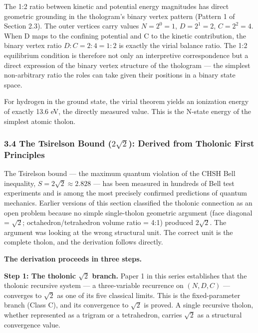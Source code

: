 \documentclass[
  11pt,
  letterpaper,
]{article}
\begin{document}
The 1:2 ratio between kinetic and potential energy magnitudes has direct
geometric grounding in the thologram's binary vertex pattern (Pattern 1
of Section 2.3). The outer vertices carry values \(N = 2^0 = 1\),
\(D = 2^1 = 2\), \(C = 2^2 = 4\). When D maps to the confining potential
and C to the kinetic contribution, the binary vertex ratio
\(D:C = 2:4 = 1:2\) is exactly the virial balance ratio. The 1:2
equilibrium condition is therefore not only an interpretive
correspondence but a direct expression of the binary vertex structure of
the thologram --- the simplest non-arbitrary ratio the roles can take
given their positions in a binary state space.

For hydrogen in the ground state, the virial theorem yields an
ionization energy of exactly 13.6 eV, the directly measured value. This
is the N-state energy of the simplest atomic tholon.

\subsubsection{\texorpdfstring{3.4 The Tsirelson Bound (\(2\sqrt{2}\)):
Derived from Tholonic First
Principles}{3.4 The Tsirelson Bound (2\textbackslash sqrt\{2\}): Derived from Tholonic First Principles}}\label{the-tsirelson-bound-2sqrt2-derived-from-tholonic-first-principles}

The Tsirelson bound --- the maximum quantum violation of the CHSH Bell
inequality, \(S = 2\sqrt{2} \approx 2.828\) --- has been measured in
hundreds of Bell test experiments and is among the most precisely
confirmed predictions of quantum mechanics. Earlier versions of this
section classified the tholonic connection as an open problem because no
simple single-tholon geometric argument (face diagonal = \(\sqrt{2}\);
octahedron/tetrahedron volume ratio = 4:1) produced \(2\sqrt{2}\). The
argument was looking at the wrong structural unit. The correct unit is
the complete tholon, and the derivation follows directly.

\textbf{The derivation proceeds in three steps.}

\textbf{Step 1: The tholonic \(\sqrt{2}\) branch.} Paper 1 in this
series establishes that the tholonic recursive system --- a
three-variable recurrence on \((N, D, C)\) --- converges to \(\sqrt{2}\)
as one of its five classical limits. This is the fixed-parameter branch
(Class C), and its convergence to \(\sqrt{2}\) is proved. A single
recursive tholon, whether represented as a trigram or a tetrahedron,
carries \(\sqrt{2}\) as a structural convergence value.
\end{document}
